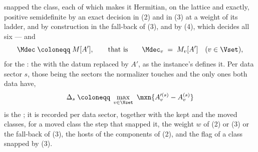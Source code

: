 \begin{definition}
snapped the class, each of which makes it Hermitian, on the lattice and
 exactly, positive semidefinite by an exact decision in
(2) and in (3) at a weight of its ladder, and by construction in the fall-back of (3), and
by (4), which decides all six --- and
\begin{equation}\label{eq:declmodel}
  \Mdec\;\coloneqq\;M[A'],
  \qquad\text{that is}\qquad
  \Mdec_v\;=\;M_v[A']\quad(v\in\Vset),
\end{equation}
for the
:
the  with the datum replaced by $A'$, as the instance's
 defines it. Per data sector $s$, those being the sectors the
normalizer touches and the only ones both data have,
\begin{equation}\label{eq:displacement}
  \Delta_s\;\coloneqq\;\max_{v\in\Vset}\
  \mxn{A'^{(s)}_v-A^{(s)}_v}
\end{equation}
is the
;
it is recorded per data sector, together with the kept and the moved classes,
for a moved class the step that snapped it, the weight $w$ of (2) or (3) or
the fall-back of (3), the hosts of the components of (2), and the flag of a
class snapped by (3).


\end{definition}
